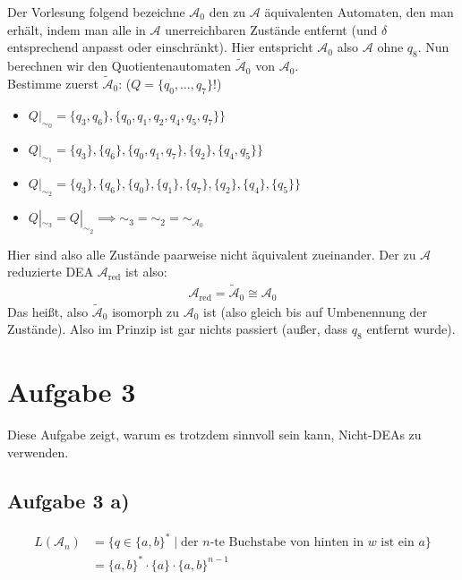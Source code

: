 \documentclass[12pt,a4paper]{article}
\newcommand{\A}{\mathcal{A}}
\begin{document}
Der Vorlesung folgend bezeichne $\A_0$ den zu $\A$ äquivalenten Automaten, den man erhält, indem man alle in $\A$ unerreichbaren Zustände entfernt (und $\delta$ entsprechend anpasst oder einschränkt). Hier entspricht $\A_0$ also $\A$ ohne $q_8$.\nl
Nun berechnen wir den Quotientenautomaten $\tilde{\A}_0$ von $\A_0$.\\
Bestimme zuerst $\tilde{\A}_0$: ($Q=\lbrace q_0,\ldots,q_7\rbrace$!)
\begin{itemize}
	\item $Q|_{\sim_0}=\big\lbrace q_3,q_6\rbrace,\lbrace q_0,q_1,q_2,q_4,q_5,q_7\rbrace\big\rbrace$
	\item $Q|_{\sim_1}=\big\lbrace q_3\rbrace,\lbrace q_6\rbrace,\lbrace q_0,q_1,q_7\rbrace,\lbrace q_2\rbrace,\lbrace q_4,q_5\rbrace\big\rbrace$
	\item $Q|_{\sim_2}=\big\lbrace q_3\rbrace,\lbrace q_6\rbrace,\lbrace q_0\rbrace,\lbrace q_1\rbrace,\lbrace q_7\rbrace,\lbrace q_2\rbrace,\lbrace q_4\rbrace,\lbrace q_5\rbrace\big\rbrace$
	\item $Q|_{\sim_3}=Q|_{\sim_2}\implies\sim_3=\sim_2=\sim_{\A_0}$
\end{itemize}
Hier sind also alle Zustände paarweise nicht äquivalent zueinander. 
Der zu $\A$ reduzierte DEA $\A_{\text{red}}$ ist also:
\begin{align*}
	\A_{\text{red}}=\tilde{\A}_0\cong\A_0
\end{align*}
Das heißt, also $\tilde{\A}_0$ isomorph zu $\A_0$ ist (also gleich bis auf Umbenennung der Zustände). Also im Prinzip ist gar nichts passiert (außer, dass $q_8$ entfernt wurde).

\section*{Aufgabe 3}
Diese Aufgabe zeigt, warum es trotzdem sinnvoll sein kann, Nicht-DEAs zu verwenden.

\subsection*{Aufgabe 3 a)}
\begin{align*}
	L(\A_n)
	&=\big\lbrace q\in\lbrace a,b\rbrace^\ast\mid\text{der $n$-te Buchstabe von hinten in $w$ ist ein }a\big\rbrace\\
	&=\lbrace a,b\rbrace^\ast\cdot\lbrace a\rbrace\cdot\lbrace a,b\rbrace^{n-1}
\end{align*}
\end{document}
